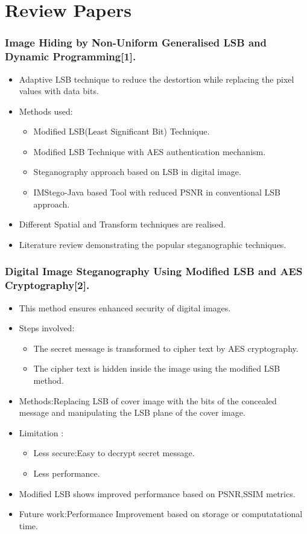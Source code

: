 \documentclass{beamer} %
\theoremstyle{definition} %
\begin{document}
\section{Review Papers}
\begin{frame}
\frametitle{Image Hiding by Non-Uniform Generalised LSB and Dynamic Programming[1].}
\begin{itemize}
	\item{Adaptive LSB technique to reduce the destortion while replacing the pixel values with data bits.}
   \item{Methods used:}
   \begin{itemize}
   	\item{Modified LSB(Least Significant Bit) Technique. }
   	\item{Modified LSB Technique with AES authentication mechanism.  }
   	\item{Steganography approach based on LSB in digital image.  }
   	\item{IMStego-Java based Tool with reduced PSNR in conventional LSB approach. }
   \end{itemize}
   \item{ Different Spatial and Transform techniques are realised.  }
   \item{Literature review demonstrating the popular steganographic techniques.}
\end{itemize}
\end{frame}

\begin{frame}
\frametitle{Digital Image Steganography Using Modified LSB and AES Cryptography[2].}
\begin{itemize}
	\item{ This method ensures enhanced security of digital images.  }
	\item {Steps involved:}
	\begin{itemize}
	\item{The secret message is transformed to cipher text by AES cryptography.}
	\item{ The cipher text is hidden inside the image using the modified LSB method.}
	\end{itemize}
	\item{Methods:Replacing LSB of cover image with the bits of the concealed message and manipulating the LSB plane of the cover image.}
	\item{Limitation :}
	\begin{itemize}
		\item {Less secure:Easy to decrypt secret message.}
		\item {Less performance.}
	\end{itemize}
	\item{Modified LSB shows improved performance based on PSNR,SSIM metrics.} 
	\item{Future work:Performance Improvement based on storage or computatational time.}
\end{itemize}
\end{frame}
\end{document}
